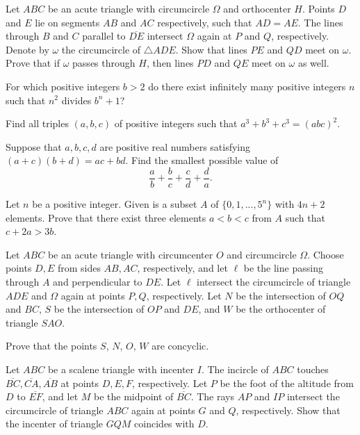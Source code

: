 \documentclass[11pt]{scrartcl}
\begin{document}
\begin{problem}[63514716280156]
Let $ABC$ be an acute triangle with circumcircle $\Omega$ and orthocenter $H$. Points $D$ and $E$ lie on segments $AB$ and $AC$ respectively, such that $AD = AE$. The lines through $B$ and $C$ parallel to $\overline{DE}$ intersect $\Omega$ again at $P$ and $Q$, respectively. Denote by $\omega$ the circumcircle of $\triangle ADE$.
Show that lines $PE$ and $QD$ meet on $\omega$.
Prove that if $\omega$ passes through $H$, then lines $PD$ and $QE$ meet on $\omega$ as well.
\end{problem}
\begin{problem}[4679791554410865501]
For which positive integers $b > 2$ do there exist infinitely many positive integers $n$ such that $n^2$ divides $b^n+1$?
\end{problem}
\begin{problem}[7088779505939683183]
Find all triples $(a, b, c)$ of positive integers such that $a^3 + b^3 + c^3 = (abc)^2$.
\end{problem}
\begin{problem}[132497611943266]
Suppose that $a,b,c,d$ are positive real numbers satisfying $(a+c)(b+d)=ac+bd$. Find the smallest possible value of
$$\frac{a}{b}+\frac{b}{c}+\frac{c}{d}+\frac{d}{a}.$$
\end{problem}
\begin{problem}[80567267310692]
Let $n$ be a positive integer. Given is a subset $A$ of $\{0,1,...,5^n\}$ with $4n+2$ elements. Prove that there exist three elements $a<b<c$ from $A$ such that $c+2a>3b$.
\end{problem}
\begin{problem}[5066939379306191291]
Let $ABC$ be an acute triangle with circumcenter $O$ and circumcircle $\Omega$. Choose points $D, E$ from sides $AB, AC$, respectively, and let $\ell$ be the line passing through $A$ and perpendicular to $DE$. Let $\ell$ intersect the circumcircle of triangle $ADE$ and $\Omega$ again at points $P, Q$, respectively. Let $N$ be the intersection of $OQ$ and $BC$, $S$ be the intersection of $OP$ and $DE$, and $W$ be the orthocenter of triangle $SAO$.

Prove that the points $S$, $N$, $O$, $W$ are concyclic.
\end{problem}
\begin{problem}[6322745101407512634]
Let $ABC$ be a scalene triangle with incenter $I$. The incircle of $ABC$ touches $\overline{BC},\overline{CA},\overline{AB}$ at points $D,E,F$, respectively. Let $P$ be the foot of the altitude from $D$ to $\overline{EF}$, and let $M$ be the midpoint of $\overline{BC}$. The rays $AP$ and $IP$ intersect the circumcircle of triangle $ABC$ again at points $G$ and $Q$, respectively. Show that the incenter of triangle $GQM$ coincides with $D$.
\end{problem}
\end{document}
